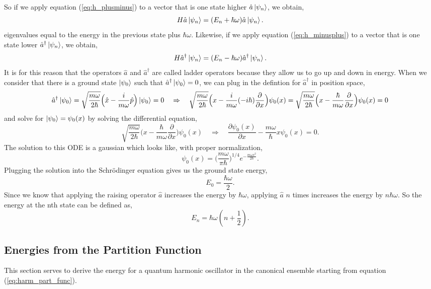 \documentclass{article}
\newcommand{\be}{\begin{equation}}
\newcommand{\ee}{\end{equation}}
\begin{document}
So if we apply equation (\ref{eq:h_plusminus}) to a vector that is one state higher $\hat{a}\ket{\psi_n}$, we obtain,
\be
  H \hat{a}\ket{\psi_n} = (E_n + \hbar \omega) \hat{a}\ket{\psi_n}.
\ee
eigenvalues equal to the energy in the previous state plus $\hbar \omega$.
Likewise, if we apply equation (\ref{eq:h_minusplus}) to a vector that is one state lower $\hat{a}^{\dagger}\ket{\psi_n}$, we obtain,
\be
  H \hat{a}^{\dagger}\ket{\psi_n} = (E_n - \hbar \omega) \hat{a}^{\dagger}\ket{\psi_n} .
\ee
It is for this reason that the operators $\hat{a}$ and $\hat{a}^{\dagger}$ are called ladder operators because they allow us to go up and down in energy.\cite{griffiths,shankar}
When we consider that there is a ground state $\ket{\psi_0}$ such that $\hat{a}^{\dagger}\ket{\psi_0} = 0$, we can plug in the defintion for $\hat{a}^{\dagger}$ in position space,
\be
  \hat{a}^{\dagger} \ket{\psi_0} = \sqrt{\frac{m \omega}{2\hbar}}\Big(\hat{x} - \frac{i}{m \omega} \hat{p} \Big)\ket{\psi_0} = 0 \quad \Rightarrow \quad \sqrt{\frac{m \omega}{2\hbar}}\Big(x - \frac{i}{m \omega} (-i \hbar) \frac{\partial}{\partial x} \Big) \psi_0(x) = \sqrt{\frac{m \omega}{2\hbar}}\Big(x - \frac{\hbar}{m \omega} \frac{\partial}{\partial x} \Big) \psi_0(x) = 0
\ee
and solve for $\ket{\psi_0} = \psi_0(x)$ by solving the differential equation,
\be
  \sqrt{\frac{m \omega}{2\hbar}}\Big(x - \frac{\hbar}{m \omega} \frac{\partial}{\partial x} \Big) \psi_0(x) \quad \Rightarrow \quad \frac{\partial \psi_0(x)}{\partial x} - \frac{m \omega}{\hbar} x \psi_0(x) = 0 .
\ee
The solution to this ODE is a gaussian which looks like, with proper normalization,
\be
  \psi_0(x) = \Big(\frac{m \omega}{\pi \hbar}\Big)^{1/4} e^{-\frac{m \omega x^2}{2 \hbar}} .
\ee
Plugging the solution into the Schr\"odinger equation gives us the ground state energy,
\be
  E_0 = \frac{\hbar \omega}{2} .
\ee
Since we know that applying the raising operator $\hat{a}$ increases the energy by $\hbar \omega$, applying $\hat{a}$ $n$ times increases the energy by $n \hbar \omega$.
So the energy at the nth state can be defined as,
\be
  E_n = \hbar \omega(n + \frac{1}{2}) .
\ee

\subsection{Energies from the Partition Function}
This section serves to derive the energy for a quantum harmonic oscillator in the canonical ensemble starting from equation (\ref{eq:harm_part_func}).
\end{document}
